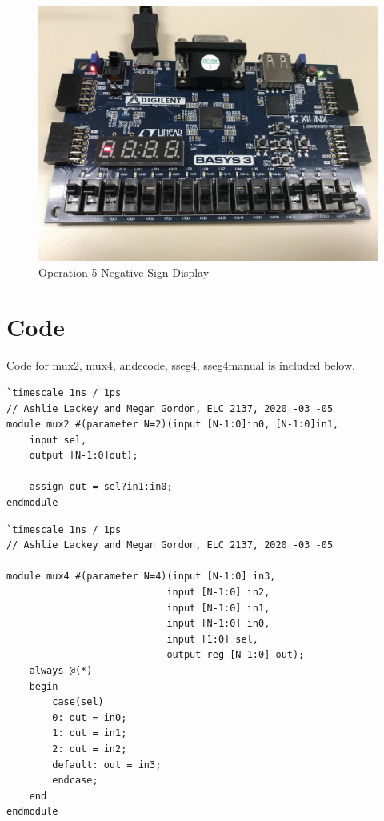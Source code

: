 \documentclass[11pt]{article}
\begin{document}
\begin{figure}[ht]\centering
	\includegraphics[angle=90, width=1\textwidth]{op5.jpg}
	\caption{Operation 5-Negative Sign Display}
	\label{fig:sim_with_table}
\end{figure}
\clearpage

\section*{Code}

Code for mux2, mux4, andecode, sseg4, sseg4manual is included below.

\begin{lstlisting}[style=Verilog,caption=Mux2 Module Code,label=code:ex ]
`timescale 1ns / 1ps
// Ashlie Lackey and Megan Gordon, ELC 2137, 2020 -03 -05
module mux2 #(parameter N=2)(input [N-1:0]in0, [N-1:0]in1, 
	input sel,
	output [N-1:0]out);
	
	assign out = sel?in1:in0;
endmodule
\end{lstlisting}

\begin{lstlisting}[style=Verilog,caption=Mux4 Module Code,label=code:ex ]
`timescale 1ns / 1ps
// Ashlie Lackey and Megan Gordon, ELC 2137, 2020 -03 -05

module mux4 #(parameter N=4)(input [N-1:0] in3, 
							input [N-1:0] in2, 
							input [N-1:0] in1, 
							input [N-1:0] in0,
							input [1:0] sel,
							output reg [N-1:0] out);
	always @(*)
	begin
		case(sel)
		0: out = in0;
		1: out = in1;
		2: out = in2;
		default: out = in3;
		endcase;
	end
endmodule
\end{lstlisting}
\end{document}
